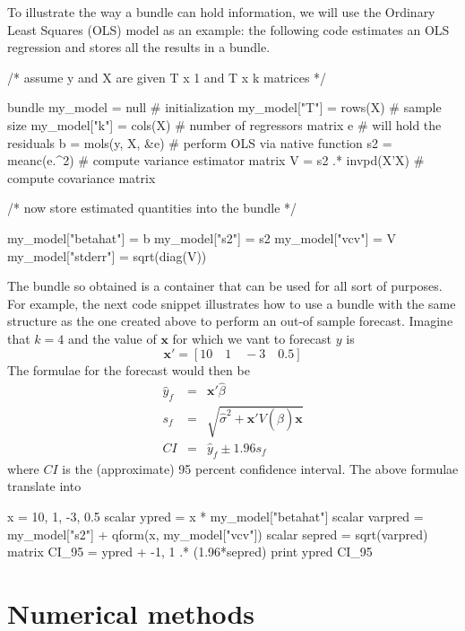 To illustrate the way a bundle can hold information, we will use the
Ordinary Least Squares (OLS) model as an example: the following code
estimates an OLS regression and stores all the results in a bundle.

\begin{code}
/* assume y and X are given T x 1 and T x k matrices */

bundle my_model = null               # initialization
my_model["T"] = rows(X)              # sample size
my_model["k"] = cols(X)              # number of regressors
matrix e                             # will hold the residuals
b = mols(y, X, &e)                   # perform OLS via native function
s2 = meanc(e.^2)                     # compute variance estimator
matrix V = s2 .* invpd(X'X)          # compute covariance matrix

/* now store estimated quantities into the bundle */

my_model["betahat"] = b
my_model["s2"] = s2
my_model["vcv"] = V
my_model["stderr"] = sqrt(diag(V))
\end{code}

The bundle so obtained is a container that can be used for all sort of
purposes. For example, the next code snippet illustrates how to use
a bundle with the same structure as the one created above to perform
an out-of sample forecast. Imagine that $k=4$ and the value of
$\mathbf{x}$ for which we vant to forecast $y$ is
\[
  \mathbf{x}' = [ 10 \quad 1  \quad -3 \quad 0.5 ]
\]
The formulae for the forecast would then be
\begin{eqnarray*}
  \hat{y}_f & = & \mathbf{x}'\hat{\beta} \\
  s_f & = & \sqrt{\hat{\sigma}^2 + \mathbf{x}'V(\hat{\beta})\mathbf{x}} \\
  CI & = & \hat{y}_f \pm 1.96 s_f 
\end{eqnarray*}
where $CI$ is the (approximate) 95 percent confidence interval. The
above formulae translate into
\begin{code}
  x = { 10, 1, -3, 0.5 }
  scalar ypred    = x * my_model["betahat"]
  scalar varpred  = my_model["s2"] + qform(x, my_model["vcv"])
  scalar sepred   = sqrt(varpred)
  matrix CI_95    = ypred + {-1, 1} .* (1.96*sepred)
  print ypred CI_95
\end{code}




\chapter{Numerical methods}

